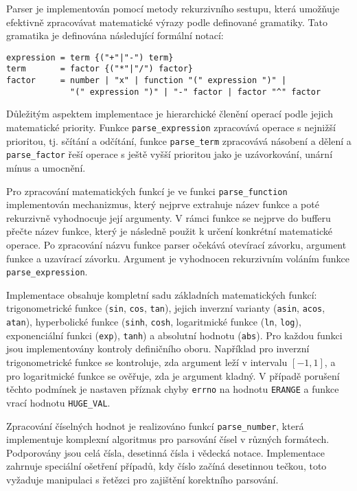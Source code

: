 \documentclass[12pt]{article} %
\begin{document}
Parser je implementován pomocí metody rekurzivního sestupu, která umožňuje efektivně zpracovávat matematické výrazy podle definované gramatiky. Tato gramatika je definována následující formální notací:
\begin{verbatim}
expression = term {("+"|"-") term}
term       = factor {("*"|"/") factor}
factor     = number | "x" | function "(" expression ")" |
             "(" expression ")" | "-" factor | factor "^" factor
\end{verbatim}
Důležitým aspektem implementace je hierarchické členění operací podle jejich matematické priority. Funkce \texttt{parse\_expression} zpracovává operace s nejnižší prioritou, tj. sčítání a odčítání,  funkce \texttt{parse\_term} zpracovává násobení a dělení a \texttt{parse\_factor} řeší operace s ještě vyšší prioritou jako je uzávorkování, unární mínus a umocnění.

Pro zpracování matematických funkcí je ve funkci \texttt{parse\_function} implementován mechanizmus, který nejprve extrahuje název funkce a poté rekurzivně vyhodnocuje její argumenty. V rámci funkce se nejprve do bufferu přečte název funkce, který je následně použit k určení konkrétní matematické operace. Po zpracování názvu funkce parser očekává otevírací závorku, argument funkce a uzavírací závorku. Argument je vyhodnocen rekurzivním voláním funkce \texttt{parse\_expression}.

Implementace obsahuje kompletní sadu základních matematických funkcí: trigonometrické funkce (\texttt{sin}, \texttt{cos}, \texttt{tan}), jejich inverzní varianty (\texttt{asin}, \texttt{acos}, \texttt{atan}), hyperbolické funkce (\texttt{sinh}, \texttt{cosh}, logaritmické funkce (\texttt{ln}, \texttt{log}), exponenciální funkci (\texttt{exp}), \texttt{tanh}) a absolutní hodnotu (\texttt{abs}).
Pro každou funkci jsou implementovány kontroly definičního oboru. Například pro inverzní trigonometrické funkce se kontroluje, zda argument leží v intervalu $[-1, 1]$, a pro logaritmické funkce se ověřuje, zda je argument kladný. V případě porušení těchto podmínek je nastaven příznak chyby \texttt{errno} na hodnotu \texttt{ERANGE} a funkce vrací hodnotu \texttt{HUGE\_VAL}.

Zpracování číselných hodnot je realizováno funkcí \texttt{parse\_number}, která implementuje komplexní algoritmus pro parsování čísel v různých formátech. Podporovány jsou celá čísla, desetinná čísla i vědecká notace. Implementace zahrnuje speciální ošetření případů, kdy číslo začíná desetinnou tečkou, toto vyžaduje manipulaci s řetězci pro zajištění korektního parsování.
\end{document}
